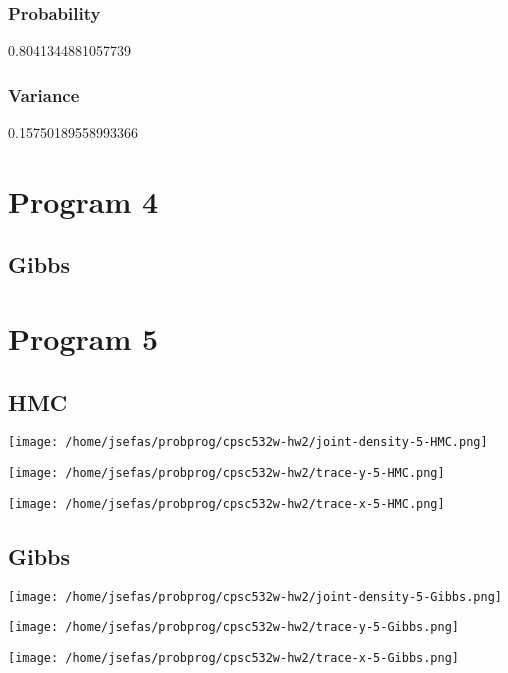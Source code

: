 \documentclass[11pt]{article}
\begin{document}
\subsubsection*{Probability}
\label{sec:org307d19e}
0.8041344881057739
\subsubsection*{Variance}
\label{sec:org8bd7c7a}
0.15750189558993366


\section*{Program 4}
\label{sec:org568b196}
\subsection*{Gibbs}
\label{sec:org574c3c7}

\section*{Program 5}
\label{sec:org19f63c9}
\subsection*{HMC}
\label{sec:org8bfbd58}
\begin{center}
\texttt{[image: /home/jsefas/probprog/cpsc532w-hw2/joint-density-5-HMC.png]}
\end{center}
\begin{center}
\texttt{[image: /home/jsefas/probprog/cpsc532w-hw2/trace-y-5-HMC.png]}
\end{center}
\begin{center}
\texttt{[image: /home/jsefas/probprog/cpsc532w-hw2/trace-x-5-HMC.png]}
\end{center}

\subsection*{Gibbs}
\label{sec:orgcc1dbc6}
\begin{center}
\texttt{[image: /home/jsefas/probprog/cpsc532w-hw2/joint-density-5-Gibbs.png]}
\end{center}
\begin{center}
\texttt{[image: /home/jsefas/probprog/cpsc532w-hw2/trace-y-5-Gibbs.png]}
\end{center}
\begin{center}
\texttt{[image: /home/jsefas/probprog/cpsc532w-hw2/trace-x-5-Gibbs.png]}
\end{center}
\end{document}
